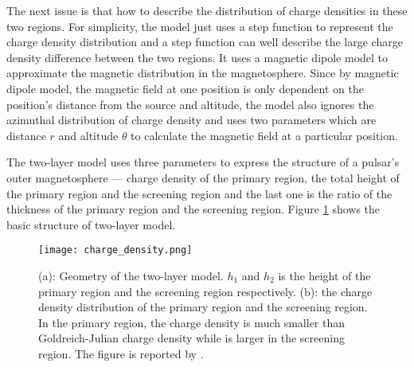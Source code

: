 \documentclass[a4paper, 12pt]{report}
\newcommand{\singleFig}[3]{
  \begin{figure}[!htp]
    \centering
    \texttt{[image: \#1]}
    \caption{#3}
    \label{fig: #1}
  \end{figure}
}
\begin{document}
    The next issue is that how to describe the distribution of charge densities in these two 
    regions. For simplicity, the model just uses a step function to represent the charge 
    density distribution and a step function can well describe the large charge density 
    difference between the two regions. It uses a magnetic dipole model to approximate the 
    magnetic distribution in the magnetosphere. Since by magnetic dipole model, the magnetic 
    field at one position is only dependent on the position's distance from the source 
    and altitude, the model also ignores the azimuthal distribution of charge density 
    and uses two parameters which are distance $r$ and altitude $\theta$ to calculate the 
    magnetic field at a particular position.

    The two-layer model uses three parameters to express the structure of a pulsar's outer 
    magnetosphere --- charge density of the primary region, the total height of the primary 
    region and the screening region and the last one is the ratio of the thickness of the 
    primary region and the screening region. Figure \ref{fig: charge_density} shows the 
    basic structure of two-layer model. 

    \begin{figure}[!htp]
      \centering 
      \texttt{[image: charge\_density.png]}
      \caption[Geometry and charge density distribution of the two-layer model.]
        {(a): Geometry of the two-layer model. $h_{1}$ and 
        $h_{2}$ is the height of the primary region and the screening region respectively. 
        (b): the charge density distribution of the primary region and the screening region. 
        In the primary region, the charge density is much smaller than Goldreich-Julian charge 
        density while is larger in the screening region. The figure is reported by
        \cite{0004-637X-720-1-178}.}
      \label{fig: charge_density}
    \end{figure}
\end{document}
